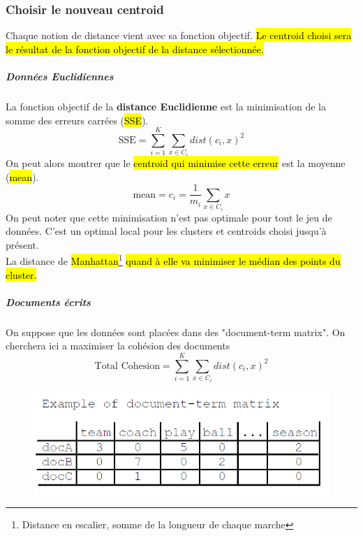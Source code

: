 \documentclass[letterpaper, 12pt]{article}
\newcommand{\alinea}{
\hspace*{0.5cm}}
\begin{document}
			\subsubsection{Choisir le nouveau centroid}
				\alinea Chaque notion de distance vient avec sa fonction
					objectif. \hl{Le centroid choisi sera le résultat de la
					fonction objectif de la distance sélectionnée.}
				\subparagraph{Données Euclidiennes} La fonction objectif
					de la \textbf{distance Euclidienne} est la minimisation
					de la somme des erreurs carrées (\hl{SSE}).
					$$ \text{SSE} = 
						\sum_{i=1}^{K}\sum_{x\in C_i} dist(c_i, x)^2 $$
					On peut alors montrer que le \hl{centroid qui minimise 
					cette erreur} est la moyenne (\hl{mean}).
					$$ \text{mean} = c_i = \frac{1}{m_i}\sum_{x\in C_i} x $$
					On peut noter que cette minimisation n'est pas optimale
					pour tout le jeu de données. C'est un optimal local
					pour les clusters et centroids choisi jusqu'à présent.\\
					La distance de \hl{Manhattan}\footnote{Distance en
					escalier, somme de la longueur de chaque marche} 
					\hl{quand à elle va minimiser le médian des points du
					cluster.}
				\subparagraph{Documents écrits} On suppose que les données
					sont placées dans des "document-term matrix". 
					On cherchera ici a maximiser la cohésion des
					documents
					$$ \text{Total Cohesion} = 
						\sum_{i=1}^{K}\sum_{x\in C_i} dist(c_i, x)^2 $$
					\begin{figure}[H]
						\centering
						\includegraphics[scale=0.5]{Images/document.png}
						\caption{}
						\label{fig:document-term}
					\end{figure}\noindent
			\newpage
\end{document}
